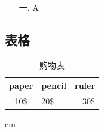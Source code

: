\begin{enumerate}%
	\item[一.] A
\end{enumerate}

\subsection{表格}
\begin{table}[!htb] %
\centering
	\begin{tabular}{|c|l|r|}
		\hline
		paper & pencil & ruler \\
		\hline
		10\$ & 20\$ & 30\$ \\
		\hline
	\end{tabular}
	\caption{购物表}
\end{table}


 cm %

\newpage
